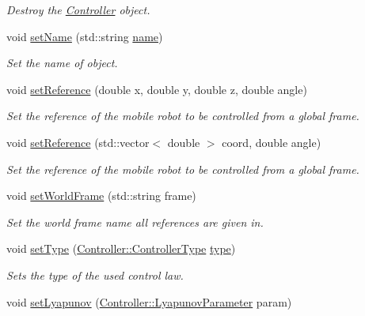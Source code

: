 \begin{DoxyCompactItemize}
\begin{DoxyCompactList}\small\item\em Destroy the \hyperlink{classController}{Controller} object. \end{DoxyCompactList}\item 
void \hyperlink{classController_a177d0d6cd7cdb7784ae9c506debfa2c6}{set\+Name} (std\+::string \hyperlink{classController_af81f22d8b64d915769acfb8e8d89e0c8}{name})
\begin{DoxyCompactList}\small\item\em Set the name of object. \end{DoxyCompactList}\item 
void \hyperlink{classController_a156a66bd7cd6340106accbb982b6238b}{set\+Reference} (double x, double y, double z, double angle)
\begin{DoxyCompactList}\small\item\em Set the reference of the mobile robot to be controlled from a global frame. \end{DoxyCompactList}\item 
void \hyperlink{classController_ae86ed49c452a9e94568312ef743aa082}{set\+Reference} (std\+::vector$<$ double $>$ coord, double angle)
\begin{DoxyCompactList}\small\item\em Set the reference of the mobile robot to be controlled from a global frame. \end{DoxyCompactList}\item 
void \hyperlink{classController_adf25339eadd9b31bc1d6b3e47395942e}{set\+World\+Frame} (std\+::string frame)
\begin{DoxyCompactList}\small\item\em Set the world frame name all references are given in. \end{DoxyCompactList}\item 
void \hyperlink{classController_a25202c469ad65696761242dce4e28d76}{set\+Type} (\hyperlink{classController_aa6d956c4c220461a4152415ffa78690a}{Controller\+::\+Controller\+Type} \hyperlink{classController_a17792cff397dc69baca568c7d03f2fc8}{type})
\begin{DoxyCompactList}\small\item\em Sets the type of the used control law. \end{DoxyCompactList}\item 
void \hyperlink{classController_abda96416fab439c188ef494a2b2a0c8e}{set\+Lyapunov} (\hyperlink{structController_1_1LyapunovParameter}{Controller\+::\+Lyapunov\+Parameter} param)

\end{DoxyCompactItemize}

